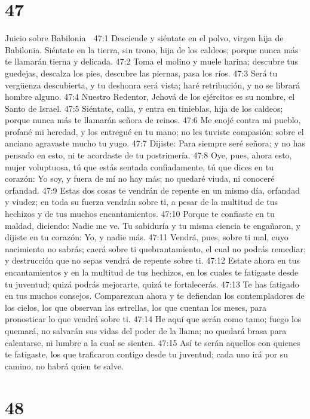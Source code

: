 \chapter{47}

Juicio sobre Babilonia  

47:1 Desciende y siéntate en el polvo, virgen hija de Babilonia. Siéntate en la tierra, sin trono, hija de los caldeos; porque nunca más te llamarán tierna y delicada.  
47:2 Toma el molino y muele harina; descubre tus guedejas, descalza los pies, descubre las piernas, pasa los ríos.  
47:3 Será tu vergüenza descubierta, y tu deshonra será vista; haré retribución, y no se librará hombre alguno.  
47:4 Nuestro Redentor, Jehová de los ejércitos es su nombre, el Santo de Israel.  
47:5 Siéntate, calla, y entra en tinieblas, hija de los caldeos; porque nunca más te llamarán señora de reinos.  
47:6 Me enojé contra mi pueblo, profané mi heredad, y los entregué en tu mano; no les tuviste compasión; sobre el anciano agravaste mucho tu yugo.  
47:7 Dijiste: Para siempre seré señora; y no has pensado en esto, ni te acordaste de tu postrimería.  
47:8 Oye, pues, ahora esto, mujer voluptuosa, tú que estás sentada confiadamente, tú que dices en tu corazón: Yo soy, y fuera de mí no hay más; no quedaré viuda, ni conoceré orfandad.  
47:9 Estas dos cosas te vendrán de repente en un mismo día, orfandad y viudez; en toda su fuerza vendrán sobre ti, a pesar de la multitud de tus hechizos y de tus muchos encantamientos.  
47:10 Porque te confiaste en tu maldad, diciendo: Nadie me ve. Tu sabiduría y tu misma ciencia te engañaron, y dijiste en tu corazón: Yo, y nadie más.  
47:11 Vendrá, pues, sobre ti mal, cuyo nacimiento no sabrás; caerá sobre ti quebrantamiento, el cual no podrás remediar; y destrucción que no sepas vendrá de repente sobre ti.  
47:12 Estate ahora en tus encantamientos y en la multitud de tus hechizos, en los cuales te fatigaste desde tu juventud; quizá podrás mejorarte, quizá te fortalecerás.  
47:13 Te has fatigado en tus muchos consejos. Comparezcan ahora y te defiendan los contempladores de los cielos, los que observan las estrellas, los que cuentan los meses, para pronosticar lo que vendrá sobre ti.  
47:14 He aquí que serán como tamo; fuego los quemará, no salvarán sus vidas del poder de la llama; no quedará brasa para calentarse, ni lumbre a la cual se sienten.  
47:15 Así te serán aquellos con quienes te fatigaste, los que traficaron contigo desde tu juventud; cada uno irá por su camino, no habrá quien te salve. 

\chapter{48}

